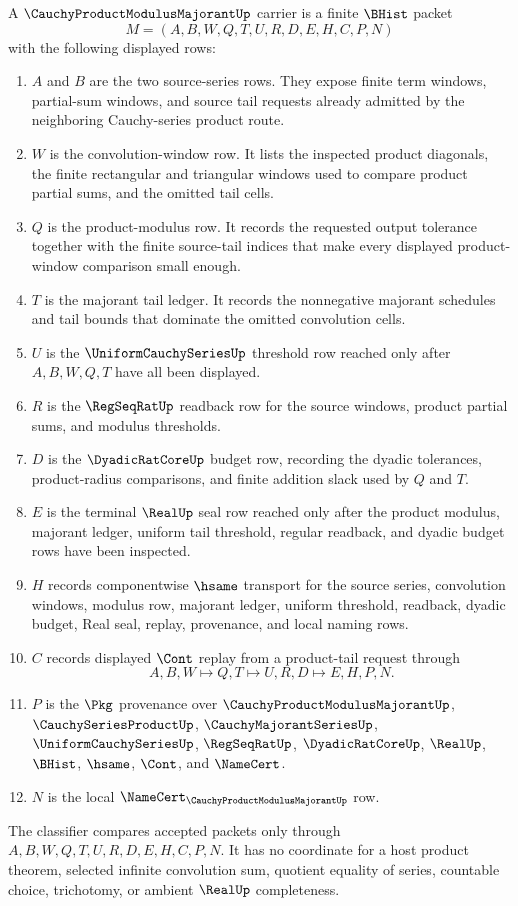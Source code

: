 \begin{definition}
\label{def:cauchy-product-modulus-majorant-carrier}
A $\CauchyProductModulusMajorantUp$ carrier is a finite $\BHist$ packet
$$
M=(A,B,W,Q,T,U,R,D,E,H,C,P,N)
$$
with the following displayed rows:
\begin{enumerate}
\item $A$ and $B$ are the two source-series rows. They expose finite term windows, partial-sum windows, and source tail requests already admitted by the neighboring Cauchy-series product route.
\item $W$ is the convolution-window row. It lists the inspected product diagonals, the finite rectangular and triangular windows used to compare product partial sums, and the omitted tail cells.
\item $Q$ is the product-modulus row. It records the requested output tolerance together with the finite source-tail indices that make every displayed product-window comparison small enough.
\item $T$ is the majorant tail ledger. It records the nonnegative majorant schedules and tail bounds that dominate the omitted convolution cells.
\item $U$ is the $\UniformCauchySeriesUp$ threshold row reached only after $A,B,W,Q,T$ have all been displayed.
\item $R$ is the $\RegSeqRatUp$ readback row for the source windows, product partial sums, and modulus thresholds.
\item $D$ is the $\DyadicRatCoreUp$ budget row, recording the dyadic tolerances, product-radius comparisons, and finite addition slack used by $Q$ and $T$.
\item $E$ is the terminal $\RealUp$ seal row reached only after the product modulus, majorant ledger, uniform tail threshold, regular readback, and dyadic budget rows have been inspected.
\item $H$ records componentwise $\hsame$ transport for the source series, convolution windows, modulus row, majorant ledger, uniform threshold, readback, dyadic budget, Real seal, replay, provenance, and local naming rows.
\item $C$ records displayed $\Cont$ replay from a product-tail request through
$$
A,B,W \longmapsto Q,T \longmapsto U,R,D \longmapsto E,H,P,N .
$$
\item $P$ is the $\Pkg$ provenance over $\CauchyProductModulusMajorantUp$, $\CauchySeriesProductUp$, $\CauchyMajorantSeriesUp$, $\UniformCauchySeriesUp$, $\RegSeqRatUp$, $\DyadicRatCoreUp$, $\RealUp$, $\BHist$, $\hsame$, $\Cont$, and $\NameCert$.
\item $N$ is the local $\NameCert_{\CauchyProductModulusMajorantUp}$ row.
\end{enumerate}
The classifier compares accepted packets only through $A,B,W,Q,T,U,R,D,E,H,C,P,N$. It has no coordinate for a host product theorem, selected infinite convolution sum, quotient equality of series, countable choice, trichotomy, or ambient $\RealUp$ completeness.
\end{definition}

